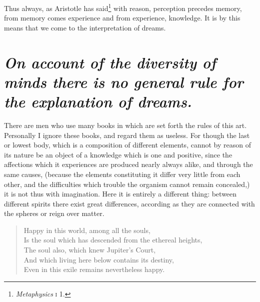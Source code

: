 \documentclass[12pt]{article}
\begin{document}
\noindent Thus always, as Aristotle has said\footnote{\textit{Metaphysics}
\textsc{i} 1.} with reason, perception precedes memory, from memory comes
experience and from experience, knowledge. It is by this means that we come to
the interpretation of dreams.


\section{\mdseries\itshape On account of the diversity of minds there is no
general rule for the explanation of dreams.}

There are men who use many books in which are set forth the rules of this art.
Personally I ignore these books, and regard them as useless. For though the
last or lowest body, which is a composition of different elements, cannot by
reason of its nature be an object of a knowledge which is one and positive,
since the affections which it experiences are produced nearly always alike, and
through the same causes, (because the elements constituting it differ very
little from each other, and the difficulties which trouble the organism cannot
remain concealed,) it is not thus with imagination. Here it is entirely a
different thing: between different spirits there exist great differences,
according as they are connected with the spheres or reign over matter.

\begin{verse}
Happy in this world, among all the souls,\\
Is the soul which has descended from the ethereal heights,\\
The soul also, which knew Jupiter's Court,\\
And which living here below contains its destiny,\\
Even in this exile remains nevertheless happy.
\end{verse}
\end{document}
